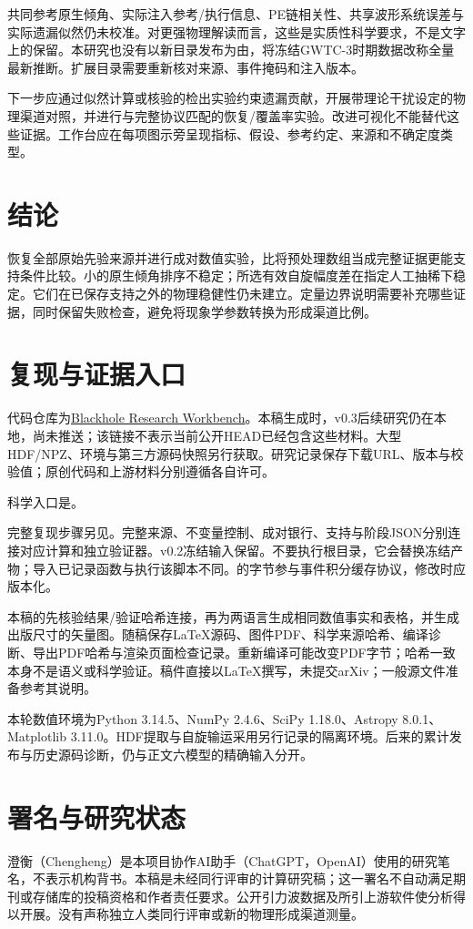 共同参考原生倾角、实际注入参考/执行信息、PE链相关性、共享波形系统误差与实际遗漏似然仍未校准。对更强物理解读而言，这些是实质性科学要求，不是文字上的保留。本研究也没有以新目录发布为由，将冻结GWTC-3时期数据改称全量最新推断。扩展目录需要重新核对来源、事件掩码和注入版本。

下一步应通过似然计算或核验的检出实验约束遗漏贡献，开展带理论干扰设定的物理渠道对照，并进行与完整协议匹配的恢复/覆盖率实验。改进可视化不能替代这些证据。工作台应在每项图示旁呈现指标、假设、参考约定、来源和不确定度类型。

\section{结论}
恢复全部原始先验来源并进行成对数值实验，比将预处理数组当成完整证据更能支持条件比较。小的原生倾角排序不稳定；所选有效自旋幅度差在指定人工抽稀下稳定。它们在已保存支持之外的物理稳健性仍未建立。定量边界说明需要补充哪些证据，同时保留失败检查，避免将现象学参数转换为形成渠道比例。

\appendix
\section{复现与证据入口}\label{app:repro}
代码仓库为\href{https://github.com/wkryyds4-netizen/blackhole-research-workbench}{Blackhole Research Workbench}。本稿生成时，v0.3后续研究仍在本地，尚未推送；该链接不表示当前公开HEAD已经包含这些材料。大型HDF/NPZ、环境与第三方源码快照另行获取。研究记录保存下载URL、版本与校验值；原创代码和上游材料分别遵循各自许可。

科学入口是。

完整复现步骤另见。完整来源、不变量控制、成对银行、支持与阶段JSON分别连接对应计算和独立验证器。v0.2冻结输入保留。不要执行根目录，它会替换冻结产物；导入已记录函数与执行该脚本不同。的字节参与事件积分缓存协议，修改时应版本化。

本稿的先核验结果/验证哈希连接，再为两语言生成相同数值事实和表格，并生成出版尺寸的矢量图。随稿保存LaTeX源码、图件PDF、科学来源哈希、编译诊断、导出PDF哈希与渲染页面检查记录。重新编译可能改变PDF字节；哈希一致本身不是语义或科学验证。稿件直接以LaTeX撰写，未提交arXiv；一般源文件准备参考其说明\cite{arxivtex}。

本轮数值环境为Python 3.14.5、NumPy 2.4.6、SciPy 1.18.0、Astropy 8.0.1、Matplotlib 3.11.0。HDF提取与自旋输运采用另行记录的隔离环境。后来的累计发布与历史源码诊断，仍与正文六模型的精确输入分开。

\section*{署名与研究状态}
澄衡（Chengheng）是本项目协作AI助手（ChatGPT，OpenAI）使用的研究笔名，不表示机构背书。本稿是未经同行评审的计算研究稿；这一署名不自动满足期刊或存储库的投稿资格和作者责任要求。公开引力波数据及所引上游软件使分析得以开展。没有声称独立人类同行评审或新的物理形成渠道测量。


